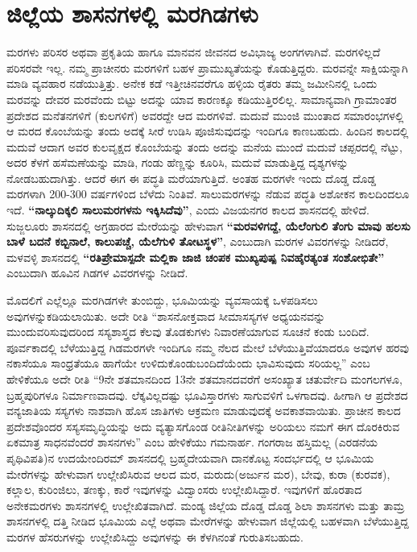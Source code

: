 \section{ಜಿಲ್ಲೆಯ ಶಾಸನಗಳಲ್ಲಿ ಮರಗಿಡಗಳು}

ಮರಗಳು ಪರಿಸರ ಅಥವಾ ಪ್ರಕೃತಿಯ ಹಾಗೂ ಮಾನವನ ಜೀವನದ ಅವಿಭಾಜ್ಯ ಅಂಗಗಳಾಗಿವೆ. ಮರಗಳಿಲ್ಲದೆ ಪರಿಸರವೇ ಇಲ್ಲ. ನಮ್ಮ ಪ್ರಾಚೀನರು ಮರಗಳಿಗೆ ಬಹಳ ಪ್ರಾಮುಖ್ಯತೆಯನ್ನು ಕೊಡುತ್ತಿದ್ದರು. ಮರವನ್ನೇ ಸಾಕ್ಷಿಯನ್ನಾಗಿ ಮಾಡಿ ವ್ಯವಹಾರ ನಡೆಯುತ್ತಿತ್ತು. ಅನೇಕ ಕಡೆ ಇತ್ತೀಚಿನವರೆಗೂ ಹಳ್ಳಿಯ ರೈತರು ತಮ್ಮ ಜಮೀನಿನಲ್ಲಿ ಒಂದು ಮರವನ್ನು ದೇವರ ಮರವೆಂದು ಬಿಟ್ಟು ಅದನ್ನು ಯಾವ ಕಾರಣಕ್ಕೂ ಕಡಿಯುತ್ತಿರಲಿಲ್ಲ. ಸಾಮಾನ್ಯವಾಗಿ ಗ್ರಾಮಾಂತರ ಪ್ರದೇಶದ ಮನೆತನಗಳಿಗೆ (ಕುಲಗಳಿಗೆ) ಅವರದ್ದೇ ಆದ ಮರಗಳಿವೆ. ಮದುವೆ ಮುಂಜಿ ಮುಂತಾದ ಸಮಾರಂಭಗಳಲ್ಲಿ ಆ ಮರದ ಕೊಂಬೆಯನ್ನು ತಂದು ಅದಕ್ಕೆ ಸೀರೆ ಉಡಿಸಿ ಪೂಜಿಸುವುದನ್ನು ಇಂದಿಗೂ ಕಾಣಬಹುದು. ಹಿಂದಿನ ಕಾಲದಲ್ಲಿ ಮದುವೆ ಆದಾಗ ಅವರ ಕುಲವೃಕ್ಷದ ಕೊಂಬೆಯನ್ನು ತಂದು ಅದನ್ನು ಮನೆಯ ಮುಂದೆ ಮದುವೆ ಚಪ್ಪರದಲ್ಲಿ ನೆಟ್ಟು, ಅದರ ಕೆಳಗೆ ಹಸೆಮಣೆಯನ್ನು ಮಾಡಿ, ಗಂಡು ಹೆಣ್ಣನ್ನು ಕೂರಿಸಿ, ಮದುವೆ ಮಾಡುತ್ತಿದ್ದ ದೃಶ್ಯಗಳನ್ನು ನೋಡಬಹುದಾಗಿತ್ತು. ಆದರೆ ಈಗ ಈ ಪದ್ಧತಿ ಮರೆಯಾಗುತ್ತಿದೆ. ಅಂತಹ ಮರಗಳೇ ಇಂದು ದೊಡ್ಡ ದೊಡ್ಡ ಮರಗಳಾಗಿ 200-300 ವರ್ಷಗಳಿಂದ ಬೆಳೆದು ನಿಂತಿವೆ. ಸಾಲುಮರಗಳನ್ನು ನೆಡುವ ಪದ್ಧತಿ ಅಶೋಕನ ಕಾಲದಿಂದಲೂ ಇದೆ. \textbf{“ನಾಲ್ಕುದಿಕ್ಕಲಿ ಸಾಲುಮರಗಳನು ಇಕ್ಕಿಸಿದೆವು”}, ಎಂದು ವಿಜಯನಗರ ಕಾಲದ ಶಾಸನದಲ್ಲಿ ಹೇಳಿದೆ. ಸುಜ್ಜಲೂರು ಶಾಸನದಲ್ಲಿ ಅಗ್ರಹಾರದ ಮೇರೆಯನ್ನು ಹೇಳುವಾಗ \textbf{“ಮರವಳಿಗದ್ದೆ, ಯೆಲೆಂಗುಲಿ ತೆಂಗು ಮಾವು\general{\break } ಹಲಸು ಬಾಳೆ ಬದನೆ ಕಬ್ಬಿನಾಲೆ, ಕಾಲುಪಚ್ಚೆ, ಯೆಲೆಗುಳಿ ತೋಟಸ್ಥಳ”}, ಎಂಬುದಾಗಿ ಮರಗಳ ವಿವರಗಳನ್ನು ನೀಡಿದರೆ, ಮಳವಳ್ಳಿ ಶಾಸನದಲ್ಲಿ \textbf{“ರತಿಪ್ರೇಮಾಸ್ಪದೇ ಮಲ್ಲಿಕಾ ಜಾಜಿ ಚಂಪಕ ಮುಖ್ಯಪುಷ್ಪ ನಿವಹೈರತ್ಯಂತ ಸಂಶೋಭಿತೇ”} ಎಂಬುದಾಗಿ ಹೂವಿನ ಗಿಡಗಳ ವಿವರಗಳನ್ನು ನೀಡಿದೆ.

ಮೊದಲಿಗೆ ಎಲ್ಲೆಲ್ಲೂ ಮರಗಿಡಗಳೇ ತುಂಬಿದ್ದು, ಭೂಮಿಯನ್ನು ವ್ಯವಸಾಯಕ್ಕೆ ಒಳಪಡಿಸಲು ಅವುಗಳನ್ನು\break ಕಡಿಯಲಾಯಿತು. ಅದೇ ರೀತಿ “ಶಾಸನೋಕ್ತವಾದ ಸೀಮಾಸಸ್ಯಗಳ ಅಧ್ಯಯನವನ್ನು ಮುಂದುವರಿಸುವುದರಿಂದ ಸಸ್ಯಶಾಸ್ತ್ರದ ಕೆಲವು ತೊಡಕುಗಳು ನಿವಾರಣೆಯಾಗುವ ಸೂಚನೆ ಕಂಡು ಬಂದಿದೆ. ಪೂರ್ವಕಾದಲ್ಲಿ ಬೆಳೆಯುತ್ತಿದ್ದ ಗಿಡಮರಗಳೇ ಇಂದಿಗೂ ನಮ್ಮ ನೆಲದ ಮೇಲೆ ಬೆಳೆಯುತ್ತಿವೆಯಾದರೂ ಅವುಗಳ ಹರವು ನಕಾಸೆಯೂ ಸಾಂಧ್ರತೆಯೂ ಹಾಗೆಯೇ ಉಳಿದುಕೊಂಡು\break ಬಂದಿದೆಯೆಂದು ಭಾವಿಸುವುದು ಸರಿಯಲ್ಲ” ಎಂಬ ಹೇಳಿಕೆಯೂ ಅದೇ ರೀತಿ “9ನೇ ಶತಮಾನದಿಂದ 13ನೇ ಶತಮಾನದವರೆಗೆ ಅಸಂಖ್ಯಾತ ಚತುರ್ವೇದಿ ಮಂಗಲಗಳೂ, ಬ್ರಹ್ಮಪುರಿಗಳೂ ನಿರ್ಮಾಣವಾದವು. ಲೆಕ್ಕವಿಲ್ಲದಷ್ಟು ಭೂವಿಸ್ತಾರಗಳು ಸಾಗುವಳಿಗೆ ಒಳಗಾದವು. ಹೀಗಾಗಿ ಆ ಪ್ರದೇಶದ ವನ್ಯಜಾತಿಯ ಸಸ್ಯಗಳು ನಾಶವಾಗಿ ಹೊಸ ಜಾತಿಗಳು ಆಕ್ರಮಣ ಮಾಡುವುದಕ್ಕೆ ಅವಕಾಶವಾಯಿತು. ಪ್ರಾಚೀನ ಕಾಲದ ಪ್ರದೇಶವೊಂದರ ಸಸ್ಯಸಮೃದ್ಧಿಯನ್ನು ಅದು ವ್ಯತ್ಯಾಸಗೊಂಡ ರೀತಿನೀತಿಗಳನ್ನು ಅರಿ\-ಯಲು ನಮಗೆ ಈಗ ದೊರಕಿರುವ ಏಕಮಾತ್ರ ಸಾಧನವೆಂದರೆ ಶಾಸನಗಳು” ಎಂಬ ಹೇಳಿಕೆಯು ಗಮನಾರ್ಹ. ಗಂಗರಾಜ ಹಸ್ತಿಮಲ್ಲ (ಎರಡನೆಯ ಪೃಥಿವಿಪತಿ)ನ ಉದಯೇಂದಿರಮ್ ಶಾಸನದಲ್ಲಿ ಬ್ರಹ್ಮದೇಯವಾಗಿ ದಾನಕೊಟ್ಟ ಸಂದರ್ಭದಲ್ಲಿ ಆ ಭೂಮಿಯ ಮೇರೆಗಳನ್ನು ಹೇಳುವಾಗ ಉಲ್ಲೇಖಿಸಿರುವ ಆಲದ ಮರ, ಮರುದು(ಅರ್ಜುನ ಮರ), ಬೇವು, ಕುರಾ (ಕುರವಕ), ಕಲ್ಲಾಲ, ಕುರಿಂಜಿಲು, ತಣಕ್ಕು, ಕಾರೆ ಇವುಗಳನ್ನು ವಿದ್ವಾಂಸರು ಉಲ್ಲೇಖಿಸಿದ್ದಾರೆ. ಇವುಗಳಿಗೆ ಹೊರತಾದ ಅನೇಕ\break ಮರಗಳು ಶಾಸನಗಳಲ್ಲಿ ಉಲ್ಲೇಖಿತವಾಗಿದೆ. ಮಂಡ್ಯ ಜಿಲ್ಲೆಯ ದೊಡ್ಡ ದೊಡ್ಡ ಶಿಲಾ ಶಾಸನಗಳು ಮತ್ತು ತಾಮ್ರ ಶಾಸನಗಳಲ್ಲಿ ದತ್ತಿ ನೀಡಿದ ಭೂಮಿಯ ಎಲ್ಲೆ ಅಥವಾ ಮೇರೆಗಳನ್ನು ಹೇಳುವಾಗ ಜಿಲ್ಲೆಯಲ್ಲಿ ಬಹಳವಾಗಿ ಬೆಳೆಯುತ್ತಿದ್ದ ಮರಗಳ ಹೆಸರುಗಳನ್ನು ಉಲ್ಲೇಖಿಸಿದ್ದು ಅವುಗಳನ್ನು ಈ ಕೆಳಗಿನಂತೆ ಗುರುತಿಸಬಹುದು.

